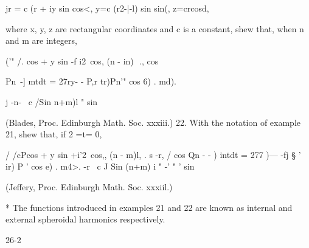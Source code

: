 jr = c (r + iy sin cos<, y=c (r2-|-l) sin sin(, z=crcosd,

where x, y, z are rectangular coordinates and c is a constant, shew
that, when n and m are integers,

('" /. cos + y sin -f i2\ cos, (n - in)\ \,., cos

Pn\ -] mtdt = 27ry- - P,r tr)Pn'" cos 6) . md).

j -n- \ c /Sin n+m)l " sin

(Blades, Proc. Edinburgh Math. Soc. xxxiii.) 22. With the notation of
example 21, shew that, if 2 =t= 0,

/ /cPcos + y sin +i'2\ cos,, (n - m)l, . s -r, / cos Qn - - ) intdt
= 277 )--- -fj § ' ir) P ' cos e) . m4>. -r \ c J Sin (n+m) i " -' " '
sin

(Jeffery, Proc. Edinburgh Math. Soc. xxxiil.)

* The functions introduced in examples 21 and 22 are known as internal
and external spheroidal harmonics respectively.

26-2
